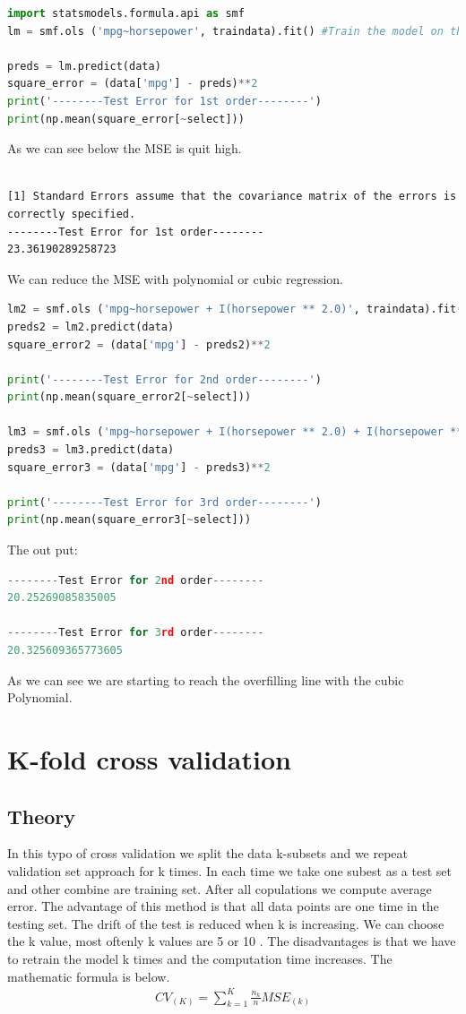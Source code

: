 \begin{lstlisting}[language=Python]
import statsmodels.formula.api as smf
lm = smf.ols ('mpg~horsepower', traindata).fit() #Train the model on the traindata.

preds = lm.predict(data)
square_error = (data['mpg'] - preds)**2
print('--------Test Error for 1st order--------')
print(np.mean(square_error[~select]))
\end{lstlisting}
As we can see below the MSE is quit high.
\begin{lstlisting}

[1] Standard Errors assume that the covariance matrix of the errors is correctly specified.
--------Test Error for 1st order--------
23.36190289258723
\end{lstlisting}
We can reduce the MSE with polynomial or cubic regression.
\begin{lstlisting}[language=Python]
lm2 = smf.ols ('mpg~horsepower + I(horsepower ** 2.0)', traindata).fit()
preds2 = lm2.predict(data)
square_error2 = (data['mpg'] - preds2)**2

print('--------Test Error for 2nd order--------')
print(np.mean(square_error2[~select]))

lm3 = smf.ols ('mpg~horsepower + I(horsepower ** 2.0) + I(horsepower ** 3.0)', traindata).fit()
preds3 = lm3.predict(data)
square_error3 = (data['mpg'] - preds3)**2

print('--------Test Error for 3rd order--------')
print(np.mean(square_error3[~select]))

\end{lstlisting}
The out put:
\begin{lstlisting}[language=Python]
--------Test Error for 2nd order--------
20.25269085835005

--------Test Error for 3rd order--------
20.325609365773605

\end{lstlisting}
As we can see we are starting to reach the overfilling line with the cubic Polynomial. 
 
\section {K-fold cross validation}
\subsection{Theory}

In this typo of cross validation we split the data k-subsets and we repeat validation set approach for k times. In each time we take one subest as a test set and other combine are training set. After all copulations we compute average error. The advantage of this method is that all data points are one time in the testing set. The drift of the test is reduced when k is increasing. We can choose the k value, most oftenly k values are 5 or 10 . The disadvantages is that we have to retrain the model k times and the computation time increases. The mathematic formula is below. 
\begin{align}\label{fo:k-fold}
CV_{(K)} = \sum_{k=1}^{K}  \frac {n_{k}}{n}MSE_{(k)}
\end{align}


